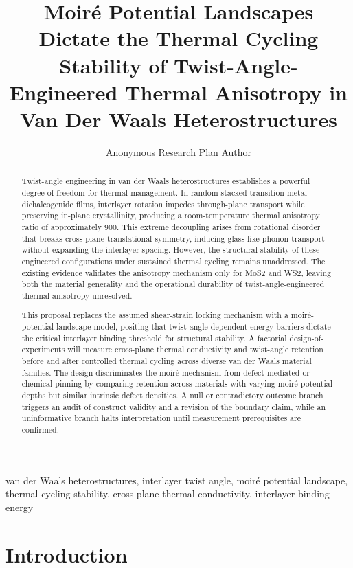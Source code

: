 \documentclass[conference]{IEEEtran}
\begin{document}
\title{Moiré Potential Landscapes Dictate the Thermal Cycling Stability of Twist-Angle-Engineered Thermal Anisotropy in Van Der Waals Heterostructures}\author{Anonymous Research Plan Author}\maketitle

\begin{abstract}
Twist-angle engineering in van der Waals heterostructures establishes a powerful degree of freedom for thermal management. In random-stacked transition metal dichalcogenide films, interlayer rotation impedes through-plane transport while preserving in-plane crystallinity, producing a room-temperature thermal anisotropy ratio of approximately 900. This extreme decoupling arises from rotational disorder that breaks cross-plane translational symmetry, inducing glass-like phonon transport without expanding the interlayer spacing. However, the structural stability of these engineered configurations under sustained thermal cycling remains unaddressed. The existing evidence validates the anisotropy mechanism only for MoS2 and WS2, leaving both the material generality and the operational durability of twist-angle-engineered thermal anisotropy unresolved.

This proposal replaces the assumed shear-strain locking mechanism with a moiré-potential landscape model, positing that twist-angle-dependent energy barriers dictate the critical interlayer binding threshold for structural stability. A factorial design-of-experiments will measure cross-plane thermal conductivity and twist-angle retention before and after controlled thermal cycling across diverse van der Waals material families. The design discriminates the moiré mechanism from defect-mediated or chemical pinning by comparing retention across materials with varying moiré potential depths but similar intrinsic defect densities. A null or contradictory outcome branch triggers an audit of construct validity and a revision of the boundary claim, while an uninformative branch halts interpretation until measurement prerequisites are confirmed.
\end{abstract}
\begin{IEEEkeywords}
van der Waals heterostructures, interlayer twist angle, moiré potential landscape, thermal cycling stability, cross-plane thermal conductivity, interlayer binding energy
\end{IEEEkeywords}\section{Introduction}
\end{document}
